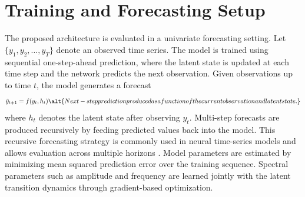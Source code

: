 \section{Training and Forecasting Setup}
The proposed architecture is evaluated in a univariate forecasting setting. Let $\{y_1, y_2, \dots, y_T\}$ denote an observed time series. The model is trained using sequential one-step-ahead prediction, where the latent state is updated at each time step and the network predicts the next observation.
Given observations up to time $t$, the model generates a forecast
\begin{equation}
\hat{y}_{t+1} = f(y_t, h_t)
\alt{Next-step prediction produced as a function of the current observation and latent state.}
\end{equation}
where $h_t$ denotes the latent state after observing $y_t$. Multi-step forecasts are produced recursively by feeding predicted values back into the model. This recursive forecasting strategy is commonly used in neural time-series models and allows evaluation across multiple horizons \cite{flunkert2020deepar}.
Model parameters are estimated by minimizing mean squared prediction error over the training sequence. Spectral parameters such as amplitude and frequency are learned jointly with the latent transition dynamics through gradient-based optimization.
